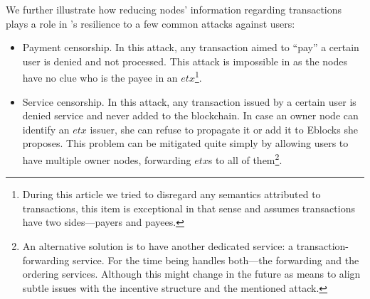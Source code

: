 We further illustrate how reducing nodes' information regarding transactions plays a role in \nameNS's resilience to a few common attacks against users:
\begin{itemize}
\item Payment censorship. In this attack, any transaction aimed to ``pay'' a certain user is denied and not processed. This attack is impossible in \name as the nodes have no clue who is the payee in an $etx$\footnote{During this article we tried to disregard any semantics attributed to transactions, this item is exceptional in that sense and assumes transactions have two sides---payers and payees.}. 

\item Service censorship. In this attack, any transaction issued by a certain user is denied service and never added to the blockchain. In case an owner node can identify an $etx$ issuer, she can refuse to propagate it or add it to Eblocks she proposes. This problem can be mitigated quite simply by allowing users to have multiple owner nodes, forwarding $etx$s to all of them\footnote{An alternative solution is to have another dedicated service: a transaction-forwarding service. For the time being \name handles both---the forwarding and the ordering services. Although this might change in the future as means to align subtle issues with the incentive structure and the mentioned attack.}.


\end{itemize}
